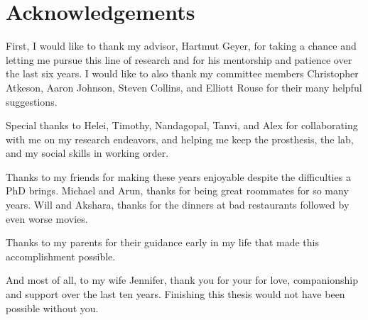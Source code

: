 \chapter*{Acknowledgements}

First, I would like to thank my advisor, Hartmut Geyer, for taking a chance and
letting me pursue this line of research and for his mentorship and patience over
the last six years. I would like to also thank my committee members Christopher
Atkeson, Aaron Johnson, Steven Collins, and Elliott Rouse for their many helpful
suggestions.

Special thanks to Helei, Timothy, Nandagopal, Tanvi, and Alex for collaborating
with me on my research endeavors, and helping me keep the prosthesis, the lab,
and my social skills in working order.

Thanks to my friends for making these years enjoyable despite the difficulties a
PhD brings. Michael and Arun, thanks for being great roommates for so many
years. Will and Akshara, thanks for the dinners at bad restaurants followed by
even worse movies.

Thanks to my parents for their guidance early in my life that made this
accomplishment possible.

And most of all, to my wife Jennifer, thank you for your for love, companionship
and support over the last ten years. Finishing this thesis would not have been
possible without you.
